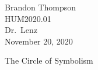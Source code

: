 \noindent
Brandon Thompson \\
HUM2020.01 \\
Dr.\ Lenz \\
November 20, 2020 \\

\begin{center}
The Circle of Symbolism
\end{center}
